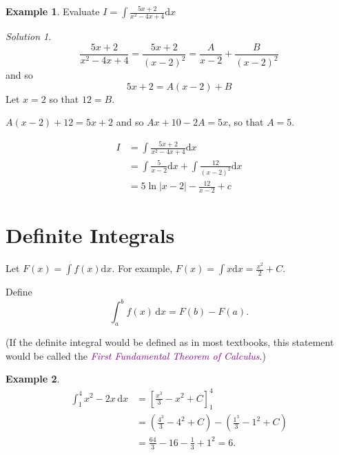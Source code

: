 \documentclass[
  english,
  11pt,
  oneside]{book}
\newcommand{\slide}{}
\theoremstyle{definition}
\theoremstyle{definition}
\newtheorem{example}{Example}[chapter]
\theoremstyle{definition}
\theoremstyle{definition}
\theoremstyle{remark}
\newtheorem*{solution}{Solution}
\begin{document}
\begin{slidesonly}

\slide
\phantom{a}

\end{slidesonly}

\slide

\begin{example}
Evaluate \(I = \displaystyle\int\frac{5x+2}{x^2-4x+4} \mathrm{d}x\)
\end{example}

\begin{solution}
\[\frac{5x+2}{x^2-4x+4} = \frac{5x+2}{(x-2)^2} = \frac A{x-2}+\frac{B}{(x-2)^2}\]
and so
\[5x+2 = A(x-2)+B\]
Let \(x=2\) so that \(12=B\).

\(A(x-2)+12 = 5x+2\) and so \(Ax+10-2A=5x\), so that \(A=5\).

\begin{align*}
I&= \int\frac{5x+2}{x^2-4x+4} \mathrm{d}x\\
&=\int\frac5{x-2}\mathrm{d}x+\int\frac{12}{(x-2)^2}\mathrm{d}x\\
&=5\ln|x-2|-\frac{12}{x-2}+c
\end{align*}
\end{solution}

\begin{slidesonly}

\slide
\phantom{a}

\end{slidesonly}

\slide

\section{Definite Integrals}\label{definite-integrals}

Let \(F(x) = \displaystyle\int f(x)\mathrm{d}x\). For example, \(F(x)=\displaystyle\int x\mathrm{d}x = \frac{x^2}{2} + C\).

Define
\[\int_a^b f(x)\,\mathrm{d}x = F(b)-F(a).\]

(If the definite integral would be defined as in most textbooks, this statement would be called the \textcolor{purple}{\em First Fundamental Theorem of Calculus}.)

\begin{notslides}

\begin{example}
\begin{align*}
\int_1^4 x^2-2x\,\mathrm{d}x& = \left[\frac{x^3}{3}-x^2+C\right]_1^4\\
&=\left(\frac{4^3}{3}-4^2+C\right) - \left(\frac{1^3}{3}-1^2+C\right)\\
&=\frac{64}{3}-16-\frac{1}{3}+1^2 = 6.
\end{align*}
\end{example}

\end{notslides}
\end{document}
